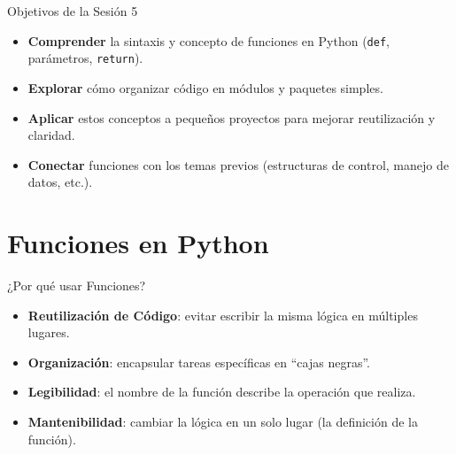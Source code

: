 \documentclass[10pt]{beamer}
\begin{document}
\begin{frame}{Objetivos de la Sesión 5}
  \begin{itemize}
    \item \textbf{Comprender} la sintaxis y concepto de funciones en Python (\texttt{def}, parámetros, \texttt{return}).
    \item \textbf{Explorar} cómo organizar código en módulos y paquetes simples.
    \item \textbf{Aplicar} estos conceptos a pequeños proyectos para mejorar reutilización y claridad.
    \item \textbf{Conectar} funciones con los temas previos (estructuras de control, manejo de datos, etc.).
  \end{itemize}

  
\end{frame}

\section{Funciones en Python}

\begin{frame}{¿Por qué usar Funciones?}
  \begin{itemize}
    \item \textbf{Reutilización de Código}: evitar escribir la misma lógica en múltiples lugares.
    \item \textbf{Organización}: encapsular tareas específicas en “cajas negras”.
    \item \textbf{Legibilidad}: el nombre de la función describe la operación que realiza.
    \item \textbf{Mantenibilidad}: cambiar la lógica en un solo lugar (la definición de la función).
  \end{itemize}
\end{frame}
\end{document}
